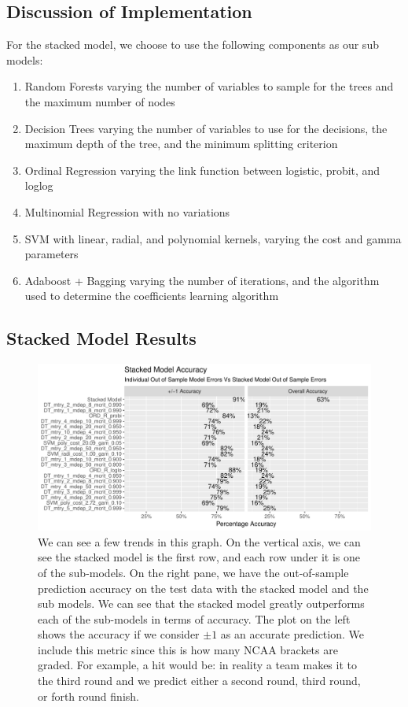 \documentclass[10pt,a4paper, hidelinks]{article} %
\begin{document}
\subsection{Discussion of Implementation}
For the stacked model, we choose to use the following components as our sub models:
\begin{multicols}{2}
	\begin{enumerate}
		\item Random Forests varying the number of variables to sample for the trees and the maximum number of nodes
		\item Decision Trees varying the number of variables to use for the decisions, the maximum depth of the tree, and the minimum splitting criterion
		\item Ordinal Regression varying the link function between logistic, probit, and loglog
		\item Multinomial Regression with no variations
		\item SVM with linear, radial, and polynomial kernels, varying the cost and gamma parameters
		\item Adaboost + Bagging varying the number of iterations, and the algorithm used to determine the coefficients learning algorithm
	\end{enumerate}
\end{multicols}

\subsection{Stacked Model Results}

\begin{figure}[H]
	\centering
	\includegraphics[width=1\linewidth]{../fig/StackedModelAccuracy}
	\caption{We can see a few trends in this graph. On the vertical axis, we can see the stacked model is the first row, and each row under it is one of the sub-models. On the right pane, we have the out-of-sample prediction accuracy on the test data with the stacked model and the sub models. We can see that the stacked model greatly outperforms each of the sub-models in terms of accuracy.  The plot on the left shows the accuracy if we consider $\pm 1$ as an accurate prediction. We include this metric since this is how many NCAA brackets are graded. For example, a hit would be: in reality a team makes it to the third round and we predict either a second round, third round, or forth round finish.}
	\label{fig:stackedmodelaccuracy}
\end{figure}
\end{document}
